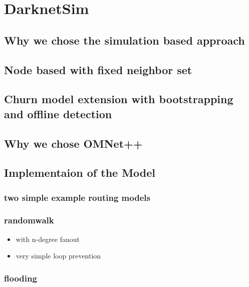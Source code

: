 \chapter{DarknetSim}

\section{Why we chose the simulation based approach}
\section{Node based with fixed neighbor set}
\section{Churn model extension with bootstrapping and offline detection}
\section{Why we chose OMNet++}

\section{Implementaion of the Model}
\subsection{two simple example routing models}
\subsection{randomwalk}
\begin{itemize}
\item            with n-degree fanout
\item            very simple loop prevention
\end{itemize}
\subsection{flooding}


